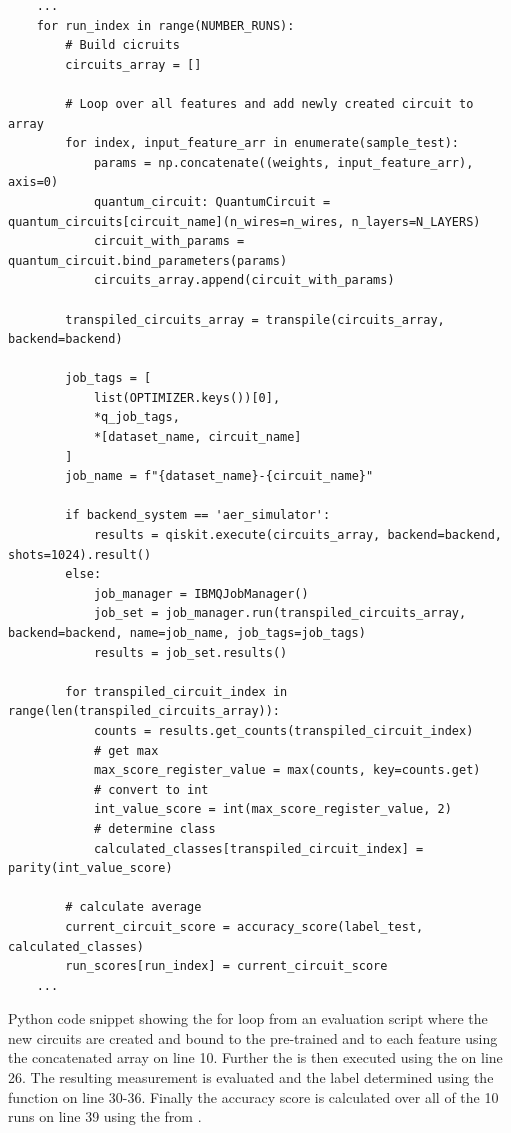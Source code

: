 \begin{listing}[!h]
    \begin{verbatim}
    ...
    for run_index in range(NUMBER_RUNS):
        # Build cicruits
        circuits_array = []

        # Loop over all features and add newly created circuit to array
        for index, input_feature_arr in enumerate(sample_test):
            params = np.concatenate((weights, input_feature_arr), axis=0)
            quantum_circuit: QuantumCircuit = quantum_circuits[circuit_name](n_wires=n_wires, n_layers=N_LAYERS)
            circuit_with_params = quantum_circuit.bind_parameters(params)
            circuits_array.append(circuit_with_params)

        transpiled_circuits_array = transpile(circuits_array, backend=backend)

        job_tags = [
            list(OPTIMIZER.keys())[0],
            *q_job_tags,
            *[dataset_name, circuit_name]
        ]
        job_name = f"{dataset_name}-{circuit_name}"

        if backend_system == 'aer_simulator':
            results = qiskit.execute(circuits_array, backend=backend, shots=1024).result()
        else:
            job_manager = IBMQJobManager()
            job_set = job_manager.run(transpiled_circuits_array, backend=backend, name=job_name, job_tags=job_tags)
            results = job_set.results()

        for transpiled_circuit_index in range(len(transpiled_circuits_array)):
            counts = results.get_counts(transpiled_circuit_index)
            # get max
            max_score_register_value = max(counts, key=counts.get)
            # convert to int
            int_value_score = int(max_score_register_value, 2)
            # determine class
            calculated_classes[transpiled_circuit_index] = parity(int_value_score)

        # calculate average
        current_circuit_score = accuracy_score(label_test, calculated_classes)
        run_scores[run_index] = current_circuit_score
    ...
    \end{verbatim}
    \caption{Python code snippet showing the  for loop from an evaluation script where the new circuits are created and bound to the pre-trained  and to each  feature using the concatenated  array on line 10. Further the  is then executed using the  on line 26. The resulting measurement is evaluated and the label determined using the  function on line 30-36. Finally the accuracy score is calculated over all of the 10 runs on line 39 using the  from \cite{scikit-learn}.}
    \label{listing:evaluation_loop_example}
\end{listing}

